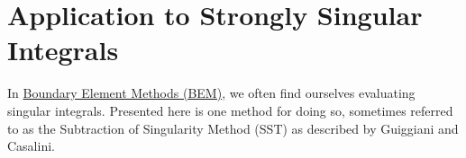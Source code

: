 \section{Application to Strongly Singular Integrals}
In \hyperref[ch:boundaryelementmethod]{Boundary Element Methods (BEM)}, we often find ourselves evaluating singular integrals. Presented here is one method for doing so, sometimes referred to as the Subtraction of Singularity Method (SST) \label{vocab:subtractionofsingularity} as described by Guiggiani and Casalini.\cite{Guiggiani1987Direct-computat}

  
 {}

 
